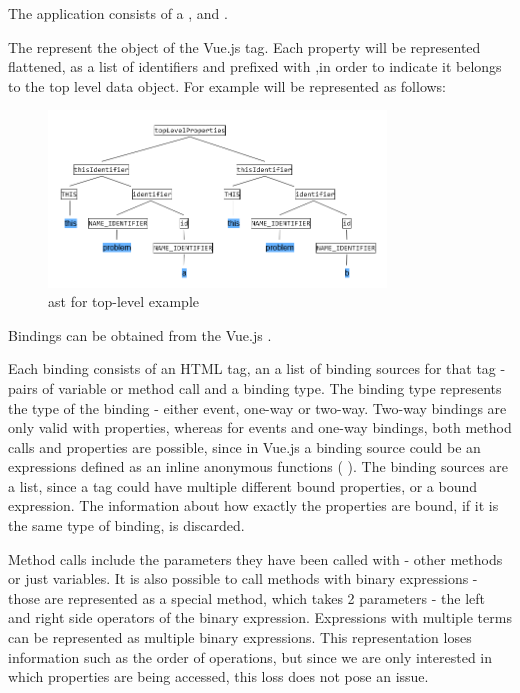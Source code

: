 The application consists of   a ,  and . 

The  represent the  object of the Vue.js  tag. Each property will be represented flattened, as a list of identifiers and prefixed with ,in order to indicate it belongs to the top level data object. For example  will be represented as follows:

\begin{figure}[H]
    \includegraphics[width=0.8\textwidth]{images/ast_top_level.png}
     \caption{\gls{ast} for top-level example }
     \label{fig:ast_top_level}
\end{figure}

Bindings can be obtained from the Vue.js .

Each binding consists of an HTML tag, an a list of binding sources for that tag - pairs of variable or method call and a binding type. The binding type represents the type of the binding - either event, one-way or two-way. Two-way bindings are only valid with properties, whereas for events and one-way bindings, both method calls and properties are possible, since in Vue.js a binding source could be an expressions defined as an inline anonymous functions (
). The binding sources are a list, since a tag could have multiple different bound properties, or a bound expression. The information about how exactly the properties are bound, if it is the same type of binding, is discarded.

Method calls include the parameters they have been called with - other methods or just variables. It is also possible to call methods with binary expressions - those are represented as a special method, which takes 2 parameters - the left and right side operators of the binary expression. Expressions with multiple terms can be represented as multiple binary expressions. This representation loses information such as the order of operations, but since we are only interested in which properties are being accessed, this loss does not pose an issue.

